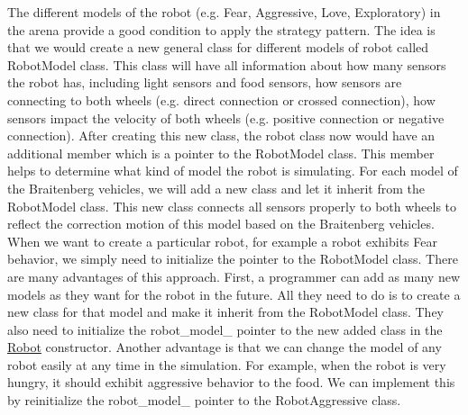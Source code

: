 The different models of the robot (e.\+g. Fear, Aggressive, Love, Exploratory) in the arena provide a good condition to apply the strategy pattern. The idea is that we would create a new general class for different models of robot called Robot\+Model class. This class will have all information about how many sensors the robot has, including light sensors and food sensors, how sensors are connecting to both wheels (e.\+g. direct connection or crossed connection), how sensors impact the velocity of both wheels (e.\+g. positive connection or negative connection). After creating this new class, the robot class now would have an additional member which is a pointer to the Robot\+Model class. This member helps to determine what kind of model the robot is simulating. For each model of the Braitenberg vehicles, we will add a new class and let it inherit from the Robot\+Model class. This new class connects all sensors properly to both wheels to reflect the correction motion of this model based on the Braitenberg vehicles. When we want to create a particular robot, for example a robot exhibits Fear behavior, we simply need to initialize the pointer to the Robot\+Model class. There are many advantages of this approach. First, a programmer can add as many new models as they want for the robot in the future. All they need to do is to create a new class for that model and make it inherit from the Robot\+Model class. They also need to initialize the robot\+\_\+model\+\_\+ pointer to the new added class in the \hyperlink{classRobot}{Robot} constructor. Another advantage is that we can change the model of any robot easily at any time in the simulation. For example, when the robot is very hungry, it should exhibit aggressive behavior to the food. We can implement this by reinitialize the robot\+\_\+model\+\_\+ pointer to the Robot\+Aggressive class.


